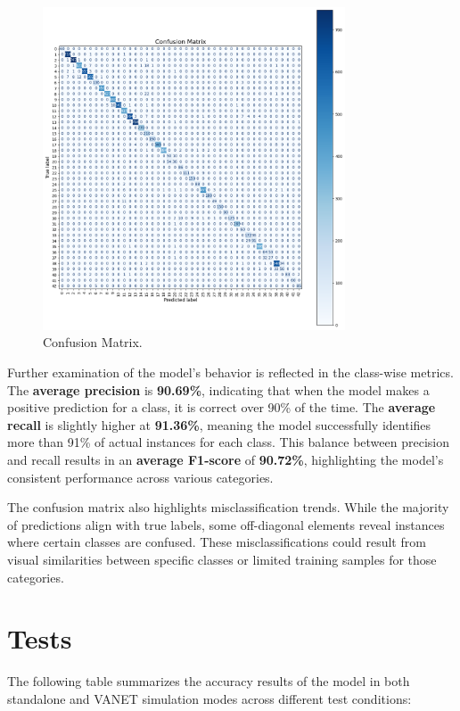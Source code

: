 \begin{figure}[H]
    \centering
    \includegraphics[width=0.8\textwidth]{images/figure13/figure14.png}
    \caption{Confusion Matrix.}
    \label{fig:fig14}
  \end{figure}

Further examination of the model's behavior is reflected in the class-wise metrics. The \textbf{average precision} is \textbf{90.69\%}, indicating that when the model makes a positive prediction for a class, it is correct over 90\% of the time. The \textbf{average recall} is slightly higher at \textbf{91.36\%}, meaning the model successfully identifies more than 91\% of actual instances for each class. This balance between precision and recall results in an \textbf{average F1-score} of \textbf{90.72\%}, highlighting the model's consistent performance across various categories.

The confusion matrix also highlights misclassification trends. While the majority of predictions align with true labels, some off-diagonal elements reveal instances where certain classes are confused. These misclassifications could result from visual similarities between specific classes or limited training samples for those categories.

\section{Tests}
The following table summarizes the accuracy results of the model in both standalone and VANET simulation modes across different test conditions:

